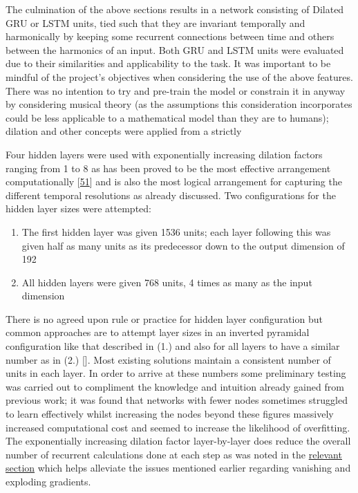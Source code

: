 \documentclass[12pt,]{article}
\providecommand{\tightlist}{%
  \setlength{\itemsep}{0pt}\setlength{\parskip}{0pt}}
\begin{document}
The culmination of the above sections results in a network consisting of
Dilated GRU or LSTM units, tied such that they are invariant temporally
and harmonically by keeping some recurrent connections between time and
others between the harmonics of an input. Both GRU and LSTM units were
evaluated due to their similarities and applicability to the task. It
was important to be mindful of the project's objectives when considering
the use of the above features. There was no intention to try and
pre-train the model or constrain it in anyway by considering musical
theory (as the assumptions this consideration incorporates could be less
applicable to a mathematical model than they are to humans); dilation
and other concepts were applied from a strictly

Four hidden layers were used with exponentially increasing dilation
factors ranging from 1 to 8 as has been proved to be the most effective
arrangement computationally
{[}\protect\hyperlink{ref-chang2017dilated}{51}{]} and is also the most
logical arrangement for capturing the different temporal resolutions as
already discussed. Two configurations for the hidden layer sizes were
attempted:

\begin{enumerate}
\def\labelenumi{\arabic{enumi}.}
\tightlist
\item
  The first hidden layer was given 1536 units; each layer following this
  was given half as many units as its predecessor down to the output
  dimension of 192
\item
  All hidden layers were given 768 units, 4 times as many as the input
  dimension
\end{enumerate}

There is no agreed upon rule or practice for hidden layer configuration
but common approaches are to attempt layer sizes in an inverted
pyramidal configuration like that described in (1.) and also for all
layers to have a similar number as in (2.) {[}{]}. Most existing
solutions maintain a consistent number of units in each layer. In order
to arrive at these numbers some preliminary testing was carried out to
compliment the knowledge and intuition already gained from previous
work; it was found that networks with fewer nodes sometimes struggled to
learn effectively whilst increasing the nodes beyond these figures
massively increased computational cost and seemed to increase the
likelihood of overfitting. The exponentially increasing dilation factor
layer-by-layer does reduce the overall number of recurrent calculations
done at each step as was noted in the
\protect\hyperlink{dilation}{relevant section} which helps alleviate the
issues mentioned earlier regarding vanishing and exploding gradients.
\end{document}

